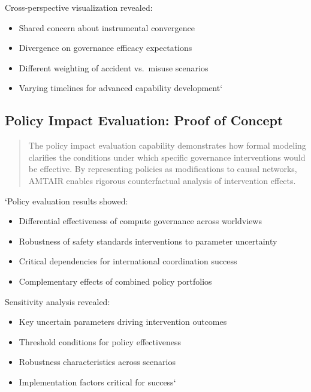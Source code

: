 \documentclass[12pt,a4paper]{report}
\providecommand{\tightlist}{%
  \setlength{\itemsep}{0pt}\setlength{\parskip}{0pt}}
\begin{document}
Cross-perspective visualization revealed:

\begin{itemize}
\tightlist
\item
  Shared concern about instrumental convergence
\item
  Divergence on governance efficacy expectations
\item
  Different weighting of accident vs.~misuse scenarios
\item
  Varying timelines for advanced capability development`
\end{itemize}

\subsection{Policy Impact Evaluation: Proof of
Concept}\label{sec-policy-impact}

\begin{quote}
The policy impact evaluation capability demonstrates how formal modeling
clarifies the conditions under which specific governance interventions
would be effective. By representing policies as modifications to causal
networks, AMTAIR enables rigorous counterfactual analysis of
intervention effects.
\end{quote}

`Policy evaluation results showed:

\begin{itemize}
\tightlist
\item
  Differential effectiveness of compute governance across worldviews
\item
  Robustness of safety standards interventions to parameter uncertainty
\item
  Critical dependencies for international coordination success
\item
  Complementary effects of combined policy portfolios
\end{itemize}

Sensitivity analysis revealed:

\begin{itemize}
\tightlist
\item
  Key uncertain parameters driving intervention outcomes
\item
  Threshold conditions for policy effectiveness
\item
  Robustness characteristics across scenarios
\item
  Implementation factors critical for success`
\end{itemize}
\end{document}
